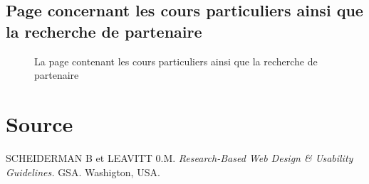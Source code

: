 \documentclass{article}[12pt]
\begin{document}
     \subsection{Page concernant les cours particuliers ainsi que la recherche de partenaire}
     \begin{figure}[H]
     	\centering
     	\caption{La page contenant les cours particuliers ainsi que la recherche de partenaire}
     \end{figure}
    \section{Source}

    SCHEIDERMAN B et LEAVITT 0.M. \textit{Research-Based Web Design \& Usability Guidelines.} GSA.  Washigton, USA.
    
\end{document}
